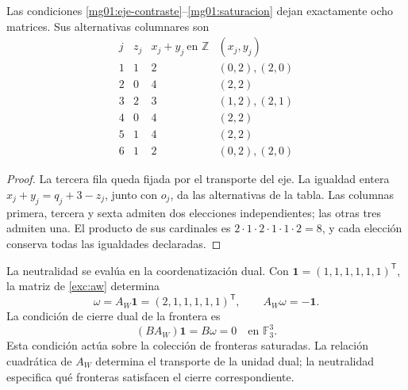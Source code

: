 \begin{proposition}
\label{mg01:ocho}
Las condiciones \eqref{mg01:eje-contraste}--\eqref{mg01:saturacion}
dejan exactamente ocho matrices. Sus alternativas columnares son
\begin{equation}
\begin{array}{c|c|c|c}
 j&z_j&x_j+y_j\ \text{en }\mathbb Z&(x_j,y_j)\\\hline
 1&1&2&(0,2),(2,0)\\
 2&0&4&(2,2)\\
 3&2&3&(1,2),(2,1)\\
 4&0&4&(2,2)\\
 5&1&4&(2,2)\\
 6&1&2&(0,2),(2,0)
\end{array}
\label{mg01:tabla-columnas}
\end{equation}
\end{proposition}
\begin{proof}
La tercera fila queda fijada por el transporte del eje. La igualdad
entera \(x_j+y_j=q_j+3-z_j\), junto con \(o_j\), da las alternativas
de la tabla. Las columnas primera, tercera y sexta admiten dos elecciones
independientes; las otras tres admiten una. El producto de sus cardinales
es \(2\cdot1\cdot2\cdot1\cdot1\cdot2=8\), y cada elección conserva
todas las igualdades declaradas.
\end{proof}

La neutralidad se evalúa en la coordenatización dual. Con
\(\mathbf1=(1,1,1,1,1,1)^{\mathsf T}\), la matriz de
\eqref{exc:aw} determina
\begin{equation}
 \omega=A_W\mathbf1=(2,1,1,1,1,1)^{\mathsf T},
 \qquad A_W\omega=-\mathbf1.
 \label{mg01:unidad-dual}
\end{equation}
La condición de cierre dual de la frontera es
\begin{equation}
 (BA_W)\mathbf1=B\omega=0\quad\text{en }\mathbb F_3^3.
 \label{mg01:neutralidad}
\end{equation}
Esta condición actúa sobre la colección de fronteras saturadas. La relación
cuadrática de \(A_W\) determina el transporte de la unidad dual; la
neutralidad especifica qué fronteras satisfacen el cierre correspondiente.

